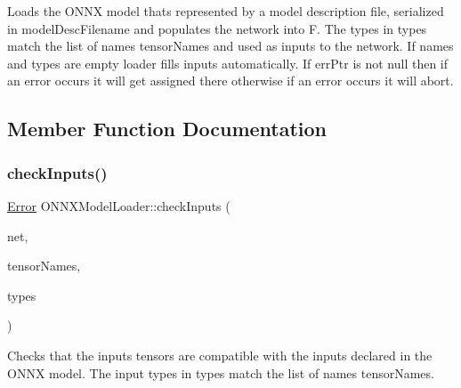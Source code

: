 Loads the O\+N\+NX model that\textquotesingle{}s represented by a model description file, serialized in {\ttfamily model\+Desc\+Filename} and populates the network into {\ttfamily F}. The types in {\ttfamily types} match the list of names {\ttfamily tensor\+Names} and used as inputs to the network. If {\ttfamily names} and {\ttfamily types} are empty loader fills inputs automatically. If {\ttfamily err\+Ptr} is not null then if an error occurs it will get assigned there otherwise if an error occurs it will abort. 

\subsection{Member Function Documentation}
\mbox{\label{classglow_1_1_o_n_n_x_model_loader_a9e92db9b3c007ae25458a7cfc0d6523f}} 
\subsubsection{\texorpdfstring{check\+Inputs()}{checkInputs()}}
{\footnotesize\ttfamily \hyperlink{namespaceglow_afdb176c3a672ef66db0ecfc19a8d39bf}{Error} O\+N\+N\+X\+Model\+Loader\+::check\+Inputs (\begin{DoxyParamCaption}\item[{O\+N\+N\+X\+\_\+\+N\+A\+M\+E\+S\+P\+A\+C\+E\+::\+Graph\+Proto \&}]{net,  }\item[{llvm\+::\+Array\+Ref$<$ const char $\ast$$>$}]{tensor\+Names,  }\item[{llvm\+::\+Array\+Ref$<$ \hyperlink{structglow_1_1_type}{Type\+Ref} $>$}]{types }\end{DoxyParamCaption})\hspace{0.3cm}{\ttfamily [protected]}}

Checks that the inputs tensors are compatible with the inputs declared in the O\+N\+NX model. The input types in {\ttfamily types} match the list of names {\ttfamily tensor\+Names}. \mbox{\label{classglow_1_1_o_n_n_x_model_loader_a3c8adfddf50b79e3c62c4482a5c7396f}} 
